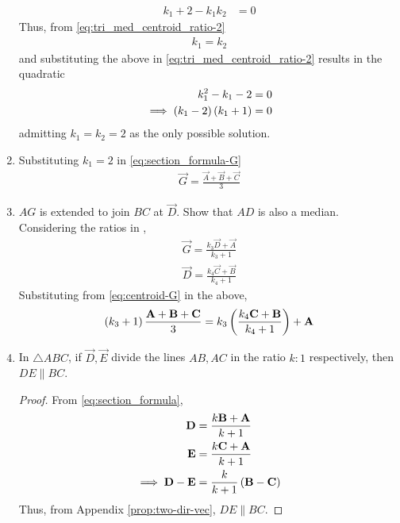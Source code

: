 \begin{enumerate}[label=\thesection.\arabic*.,ref=\thesection.\theenumi]
\begin{align}
	  k_1 +2 - k_1k_2 &=0
\label{eq:tri_med_centroid_ratio-2}
  \end{align}
  Thus, from 
\eqref{eq:tri_med_centroid_ratio-2}
  \begin{align}
	  k_1=k_2
  \end{align}
  and substituting the above in 
\eqref{eq:tri_med_centroid_ratio-2} results in the quadratic
  \begin{align}
	  k_1^2 - k_1-2 &=0
	  \\
	  \implies 
	  \left(k_1-2\right)\left(k_1+1\right) &=0
  \end{align}
  admitting $k_1=k_2=2$ as the only possible solution.
  \item Substituting $k_1 =2 $ in 
	  \eqref{eq:section_formula-G}
  \begin{align}
	  \vec{G}=\frac{\vec{A}+\vec{B} + \vec{C}}{3}
	  \label{eq:centroid-G}
  \end{align}
\item $AG$ is extended to join $BC$ at $\vec{D}$.  Show that $AD$ is also a median.
	\\
	\solution Considering the ratios in \figref{},
  \begin{align}
\vec{G} = 
	  \frac{k_3\vec{D}+\vec{A} }{k_3+1} 
	  \\
	\vec{D}  =\frac{k_4\vec{C}+\vec{B} }{k_4+1} 
  \end{align}
  Substituting from 
	  \eqref{eq:centroid-G}
	  in the above, 
  \begin{align}
	  \left(k_3+1\right)\frac{\mathbf{A}+\mathbf{B} + \mathbf{C}}{3}
 = 
	  {k_3\left(\frac{k_4\mathbf{C}+\mathbf{B} }{k_4+1}\right) +\mathbf{A} } 
  \end{align}
  \iffalse
  \item In $\triangle ABC$, if $\vec{D}, \vec{E}$ divide the lines $AB, AC$ in the ratio $k:1$ respectively,  then $DE \parallel BC$.
	  \label{prop:two-tri-bpt}
	  \begin{proof}
		  From 
	  \eqref{eq:section_formula}, 
  \begin{align}
	  \mathbf{D}&= \frac{k\mathbf{B}+ \mathbf{A}}{k+1}
	  \\
	  \mathbf{E}&= \frac{k\mathbf{C}+ \mathbf{A}}{k+1}
	  \\
	  \implies 
	  \mathbf{D}-	  \mathbf{E}&= \frac{k}{k+1}\left(\mathbf{B}- \mathbf{C}\right)
  \end{align}
  Thus, from 
		  Appendix \ref{prop:two-dir-vec}, $DE \parallel BC$.

	  \end{proof}


\end{enumerate}
